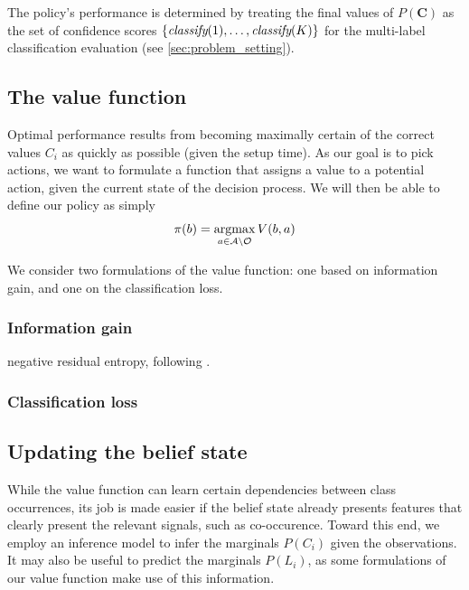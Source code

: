 \documentclass[runningheads]{llncs}
\begin{document}
The policy's performance is determined by treating the final values of $P(\mathbf{C})$ as the set of confidence scores $\{\emph{classify}(1), \dots, \emph{classify}(K)\}$ for the multi-label classification evaluation (see \autoref{sec:problem_setting}).

\subsection{The value function} \label{sec:value}
Optimal performance results from becoming maximally certain of the correct values $C_i$ as quickly as possible (given the setup time).
As our goal is to pick actions, we want to formulate a function that assigns a value to a potential action, given the current state of the decision process.
We will then be able to define our policy as simply
\begin{equation}
\pi(b) = \argmax_{a \in \mathcal{A} \setminus \mathcal{O}} V(b,a)
\end{equation}

We consider two formulations of the value function: one based on information gain, and one on the classification loss.

\subsubsection{Information gain}
negative residual entropy, following \cite{Gao2011}.


\subsubsection{Classification loss}

\subsection{Updating the belief state}
While the value function can learn certain dependencies between class occurrences, its job is made easier if the belief state already presents features that clearly present the relevant signals, such as co-occurence.
Toward this end, we employ an inference model to infer the marginals $P(C_i)$ given the observations.
It may also be useful to predict the marginals $P(L_i)$, as some formulations of our value function make use of this information.
\end{document}

